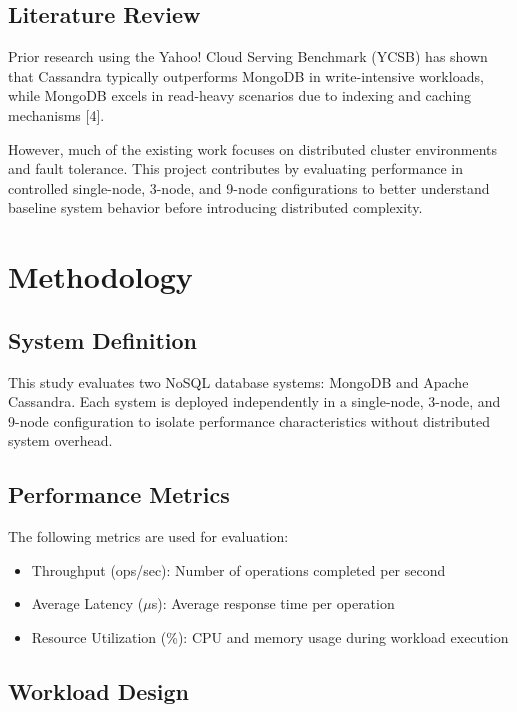\documentclass[12pt]{article}
\begin{document}
\subsection{Literature Review}

Prior research using the Yahoo! Cloud Serving Benchmark (YCSB) has shown that Cassandra typically outperforms MongoDB in write-intensive workloads, while MongoDB excels in read-heavy scenarios due to indexing and caching mechanisms [4].

However, much of the existing work focuses on distributed cluster environments and fault tolerance. This project contributes by evaluating performance in controlled single-node, 3-node, and 9-node configurations to better understand baseline system behavior before introducing distributed complexity.

\section{Methodology}

\subsection{System Definition}

This study evaluates two NoSQL database systems: MongoDB and Apache Cassandra. Each system is deployed independently in a single-node, 3-node, and 9-node configuration to isolate performance characteristics without distributed system overhead.

\subsection{Performance Metrics}

The following metrics are used for evaluation:

\begin{itemize}
\item Throughput (ops/sec): Number of operations completed per second
\item Average Latency ($\mu$s): Average response time per operation
\item Resource Utilization (\%): CPU and memory usage during workload execution
\end{itemize}

\subsection{Workload Design}
\end{document}
